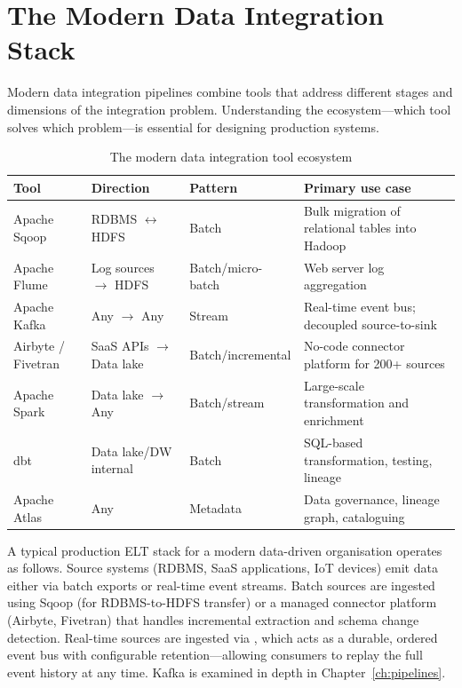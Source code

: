 \section{The Modern Data Integration Stack}
\label{sec:integration-stack}

Modern data integration pipelines combine tools that address different
stages and dimensions of the integration problem. Understanding the
ecosystem---which tool solves which problem---is essential for designing
production systems.

\begin{table}[h!t]
\centering
\caption{The modern data integration tool ecosystem}
\label{tab:integration-tools}
\renewcommand{\arraystretch}{1.4}
\begin{tabular}{L{2.2cm} L{2.0cm} L{2.0cm} L{4.8cm}}
\toprule
\textbf{Tool}          & \textbf{Direction}   & \textbf{Pattern} & \textbf{Primary use case} \\
\midrule
Apache Sqoop           & RDBMS $\leftrightarrow$ HDFS & Batch    & Bulk migration of relational tables into Hadoop \\
Apache Flume           & Log sources $\to$ HDFS & Batch/micro-batch & Web server log aggregation \\
Apache Kafka           & Any $\to$ Any         & Stream    & Real-time event bus; decoupled source-to-sink \\
Airbyte / Fivetran     & SaaS APIs $\to$ Data lake & Batch/incremental & No-code connector platform for 200+ sources \\
Apache Spark           & Data lake $\to$ Any   & Batch/stream & Large-scale transformation and enrichment \\
dbt                    & Data lake/DW internal & Batch    & SQL-based transformation, testing, lineage \\
Apache Atlas           & Any                   & Metadata  & Data governance, lineage graph, cataloguing \\
\bottomrule
\end{tabular}
\end{table}

A typical production ELT stack for a modern data-driven organisation
operates as follows. Source systems (RDBMS, SaaS applications, IoT
devices) emit data either via batch exports or real-time event streams.
Batch sources are ingested using Sqoop (for RDBMS-to-HDFS transfer) or
a managed connector platform (Airbyte, Fivetran) that handles
incremental extraction and schema change detection. Real-time sources
are ingested via , which acts as a durable, ordered
event bus with configurable retention---allowing consumers to replay
the full event history at any time. Kafka is examined in depth in
Chapter~\ref{ch:pipelines}.

